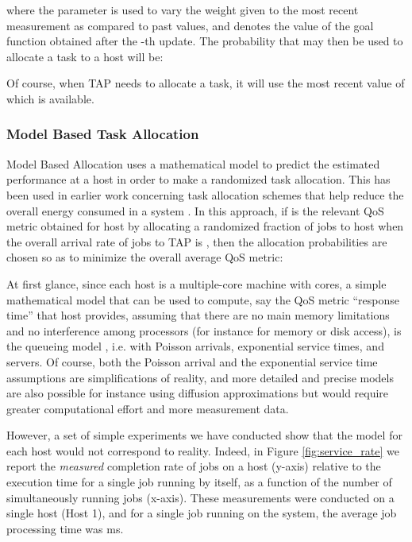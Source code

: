 \documentclass[journal]{IEEEtran}
\begin{document}
where the parameter  is used to vary the weight given to the most recent measurement as compared to past values, and  denotes the value of the goal function obtained
after the -th update. The probability  that may then be used to allocate a task to a host will be:

Of course, when TAP needs to allocate a task, it will use the most recent value of  which is available.

\subsubsection{Model Based Task Allocation} \label{math}

Model Based Allocation uses a mathematical model to predict the estimated performance at a host in order to make a randomized task allocation. This has been used in earlier work concerning
task allocation schemes that help reduce the overall energy consumed in a system \cite{thai13}. In this approach, if  is the relevant QoS metric obtained
for host  by allocating a randomized fraction  of jobs to host  when the overall arrival rate of jobs to TAP is , then the allocation probabilities  are chosen so as to minimize the
overall average QoS metric:

At first glance, since each host  is a multiple-core machine with  cores, a simple mathematical model that can be used to compute, say the QoS metric
``response time''  that host  provides, assuming that there
are no main memory limitations and no interference among processors (for instance for memory or disk access), is the  queueing model \cite{Gelenbe-Mitrani}, i.e. with Poisson arrivals, exponential service times, and  servers. Of course, both the
Poisson arrival and the exponential service time assumptions are simplifications of reality, and more detailed and precise models are also possible for instance using
diffusion approximations \cite{Diffusion} but would require greater computational effort and more measurement data.

However, a set of simple experiments we have conducted show that the  model for each host would not correspond to reality. Indeed, in Figure \ref{fig:service_rate} we report the {\em measured}
completion rate of jobs on a host (y-axis) relative to the execution time for a single job running by itself, as a function of the number of simultaneously running
jobs (x-axis). These measurements were conducted on a single host (Host 1), and for a single job running on the system, the average
job processing time was ms.
\end{document}
